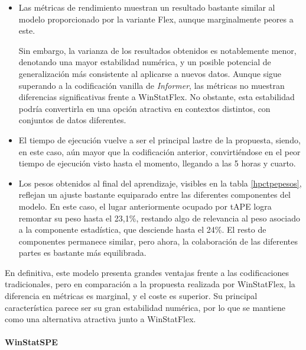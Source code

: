 \begin{itemize}
	\item Las métricas de rendimiento muestran un resultado bastante similar al modelo proporcionado por la variante Flex, aunque marginalmente peores a este. 
	
	Sin embargo, la varianza de los resultados obtenidos es notablemente menor, denotando una mayor estabilidad numérica, y un posible potencial de generalización más consistente al aplicarse a nuevos datos. Aunque sigue superando a la codificación vanilla de \textit{Informer}, las métricas no muestran diferencias significativas frente a WinStatFlex. No obstante, esta estabilidad podría convertirla en una opción atractiva en contextos distintos, con conjuntos de datos diferentes.
	
	\item El tiempo de ejecución vuelve a ser el principal lastre de la propuesta, siendo, en este caso, aún mayor que la codificación anterior, convirtiéndose en el peor tiempo de ejecución visto hasta el momento, llegando a las 5 horas y cuarto.
	
	\item Los pesos obtenidos al final del aprendizaje, visibles en la tabla \ref{hpctpepesos}, reflejan un ajuste bastante equiparado entre las diferentes componentes del modelo. En este caso, el lugar anteriormente ocupado por tAPE logra remontar su peso hasta el 23,1\%, restando algo de relevancia al peso asociado a la componente estadística, que desciende hasta el 24\%. El resto de componentes permanece similar, pero ahora, la colaboración de las diferentes partes es bastante más equilibrada.
\end{itemize}

En definitiva, este modelo presenta grandes ventajas frente a las codificaciones tradicionales, pero en comparación a la propuesta realizada por WinStatFlex, la diferencia en métricas es marginal, y el coste es superior. Su principal característica parece ser su gran estabilidad numérica, por lo que se mantiene como una alternativa atractiva junto a WinStatFlex.

\paragraph{WinStatSPE}

